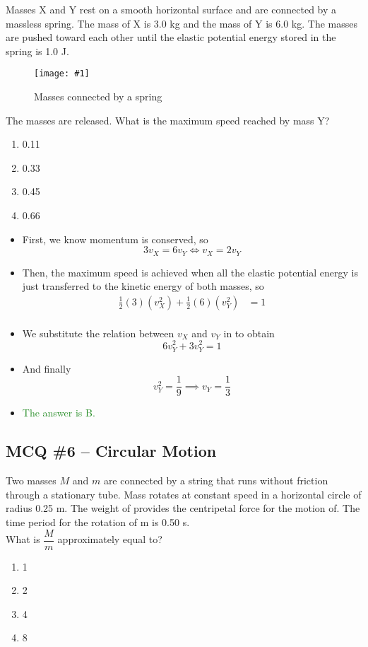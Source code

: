\documentclass[a4paper,12pt]{article}
\newcommand{\lb}{\\[8pt]}
\newcommand{\img}[4]{\begin{center}
  \begin{figure}[H]
    \centering
    \texttt{[image: \#1]}
    \caption{#3}
    \label{fig:#4}
  \end{figure}
\end{center}}
\newcommand{\ans}[1]{\textcolor{ForestGreen}{The answer is #1.}}
\begin{document}
Masses X and Y rest on a smooth horizontal surface and are connected by a massless spring. The mass of X is 3.0 kg and the mass of Y is 6.0 kg. The masses are pushed toward each other until the elastic potential energy stored in the spring is 1.0 J.

\img{ex/12.png}{0.3}{Masses connected by a spring}{spring}

The masses are released. What is the maximum speed reached by mass Y?

\begin{enumerate}[label=\Alph*.]
  \item 0.11
  \item 0.33
  \item 0.45
  \item 0.66
\end{enumerate}

\begin{itemize}
  \item First, we know momentum is conserved, so
        $$3v_X = 6v_Y \iff v_X = 2v_Y$$
  \item Then, the maximum speed is achieved when all the elastic potential energy is just transferred to the kinetic energy of both masses, so
        \begin{align*}
          \frac{1}{2}(3)(v_X^2) + \frac{1}{2}(6)(v_Y^2) & = 1 \\
        \end{align*}
  \item We substitute the relation between $v_X$ and $v_Y$ in to obtain
        $$6v_Y^2 + 3v_Y^2 = 1$$
  \item And finally
        $$v_Y^2 = \frac{1}{9} \implies v_Y = \frac{1}{3}$$
  \item \ans{B}
\end{itemize}

\subsection{MCQ \#6 -- Circular Motion}

Two masses $M$ and $m$ are connected by a string that runs without friction through a stationary tube. Mass rotates at constant speed in a horizontal circle of radius 0.25 m. The weight of provides the centripetal force for the motion of. The time period for the rotation of m is 0.50 s.\lb
What is $\dfrac{M}{m}$ approximately equal to?

\begin{enumerate}[label=\Alph*.]
  \item 1
  \item 2
  \item 4
  \item 8
\end{enumerate}
\end{document}
